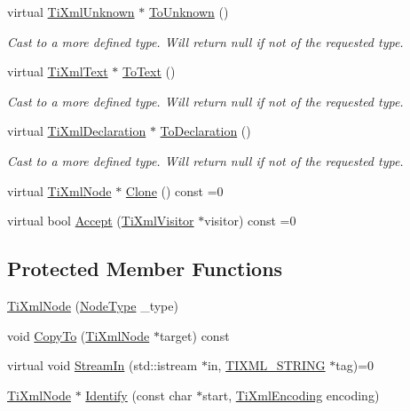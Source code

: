 \begin{DoxyCompactItemize}
virtual \hyperlink{class_ti_xml_unknown}{Ti\-Xml\-Unknown} $\ast$ \hyperlink{class_ti_xml_node_a06de5af852668c7e4af0d09c205f0b0d}{To\-Unknown} ()
\begin{DoxyCompactList}\small\item\em Cast to a more defined type. Will return null if not of the requested type. \end{DoxyCompactList}\item 
virtual \hyperlink{class_ti_xml_text}{Ti\-Xml\-Text} $\ast$ \hyperlink{class_ti_xml_node_a3ddfbcac78fbea041fad57e5c6d60a03}{To\-Text} ()
\begin{DoxyCompactList}\small\item\em Cast to a more defined type. Will return null if not of the requested type. \end{DoxyCompactList}\item 
virtual \hyperlink{class_ti_xml_declaration}{Ti\-Xml\-Declaration} $\ast$ \hyperlink{class_ti_xml_node_a4027136ca820ff4a636b607231b6a6df}{To\-Declaration} ()
\begin{DoxyCompactList}\small\item\em Cast to a more defined type. Will return null if not of the requested type. \end{DoxyCompactList}\item 
virtual \hyperlink{class_ti_xml_node}{Ti\-Xml\-Node} $\ast$ \hyperlink{class_ti_xml_node_a4508cc3a2d7a98e96a54cc09c37a78a4}{Clone} () const =0
\item 
virtual bool \hyperlink{class_ti_xml_node_acc0f88b7462c6cb73809d410a4f5bb86}{Accept} (\hyperlink{class_ti_xml_visitor}{Ti\-Xml\-Visitor} $\ast$visitor) const =0
\end{DoxyCompactItemize}
\subsection*{Protected Member Functions}
\begin{DoxyCompactItemize}
\item 
\hyperlink{class_ti_xml_node_a3f46721695868667113c7487ff123f20}{Ti\-Xml\-Node} (\hyperlink{class_ti_xml_node_a836eded4920ab9e9ef28496f48cd95a2}{Node\-Type} \-\_\-type)
\item 
void \hyperlink{class_ti_xml_node_ab6056978923ad8350fb5164af32d8038}{Copy\-To} (\hyperlink{class_ti_xml_node}{Ti\-Xml\-Node} $\ast$target) const 
\item 
virtual void \hyperlink{class_ti_xml_node_ab4b4af1a6b486dcbc0e327cf291270af}{Stream\-In} (std\-::istream $\ast$in, \hyperlink{tinyxml_8h_a92bada05fd84d9a0c9a5bbe53de26887}{T\-I\-X\-M\-L\-\_\-\-S\-T\-R\-I\-N\-G} $\ast$tag)=0
\item 
\hyperlink{class_ti_xml_node}{Ti\-Xml\-Node} $\ast$ \hyperlink{class_ti_xml_node_ac1e3a8e7578be463b04617786120c2bb}{Identify} (const char $\ast$start, \hyperlink{tinyxml_8h_a88d51847a13ee0f4b4d320d03d2c4d96}{Ti\-Xml\-Encoding} encoding)
\end{DoxyCompactItemize}
